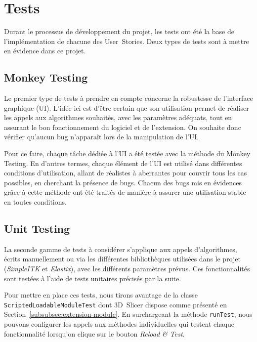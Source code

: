 \documentclass{article}
\begin{document}
{
    \section{Tests}
    \label{sec:testing}

    Durant le processus de développement du projet, les tests ont été la base de l'implémentation de chacune des User~Stories. Deux types de tests sont à mettre en évidence dans ce projet.

    {
        \bigskip
        \subsection{Monkey Testing}
        \label{subsec:monkey-testing}

        Le premier type de tests à prendre en compte concerne la robustesse de l'interface graphique (UI). L'idée ici est d'être certain que son utilisation permet de réaliser les appels aux algorithmes souhaités, avec les paramètres adéquats, tout en assurant le bon fonctionnement du logiciel et de l'extension. On souhaite donc vérifier qu'aucun bug n'apparaît lors de la manipulation de l'UI.

        \bigskip

        Pour ce faire, chaque tâche dédiée à l'UI a été testée avec la méthode du Monkey Testing. En d'autres termes, chaque élément de l'UI est utilisé dans différentes conditions d'utilisation, allant de réalistes à aberrantes pour couvrir tous les cas possibles, en cherchant la présence de bugs. Chacun des bugs mis en évidences grâce à cette méthode ont été traités de manière à assurer une utilisation stable en toutes conditions.
    }

    {
        \bigskip
        \subsection{Unit Testing}
        \label{subsec:unit-testing}

        La seconde gamme de tests à considérer s'applique aux appels d'algorithmes, écrits manuellement ou via les différentes bibliothèques utilisées dans le projet (\textit{SimpleITK} et \textit{Elastix}), avec les différents paramètres prévus. Ces fonctionnalités sont testées à l'aide de tests unitaires précisés par la suite.

        \bigskip

        Pour mettre en place ces tests, nous tirons avantage de la classe \texttt{ScriptedLoadableModuleTest} dont 3D~Slicer dispose comme présenté en Section~\ref{subsubsec:extension-module}. En surchargeant la méthode \texttt{runTest}, nous pouvons configurer les appels aux méthodes individuelles qui testent chaque fonctionnalité lorsqu'on clique sur le bouton \textit{Reload \& Test}.

}}
\end{document}
